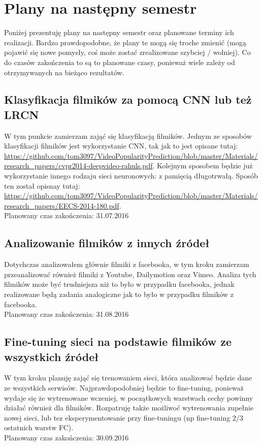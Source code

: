 \documentclass{article}
\begin{document}
\section{Plany na następny semestr}
Poniżej prezentuję plany na następny semestr oraz planowane terminy ich realizacji. Bardzo prawdopodobne, że plany te mogą się troche zmienić (mogą pojawić się nowe pomysły, coś może zostać zrealizowane szybciej / wolniej). Co do czasów zakończenia to są to planowane czasy, ponieważ wiele zależy od otrzymywanych na bieżąco rezultatów.

\subsection{Klasyfikacja filmików za pomocą CNN lub też LRCN}
W tym punkcie zamierzam zająć się klasyfikacją filmików. Jednym ze sposobów klasyfikacji filmików jest wykorzystanie CNN, tak jak to jest opisane tutaj: \url{https://github.com/tom3097/VideoPopularityPrediction/blob/master/Materials/research_papers/cvpr2014-deepvideo-rahuls.pdf}. Kolejnym sposobem będzie już wykorzystanie innego rodzaju sieci neuronowych: z pamięcią długotrwałą. Sposób ten został opisnay tutaj: \url{https://github.com/tom3097/VideoPopularityPrediction/blob/master/Materials/research_papers/EECS-2014-180.pdf}.
\\Planowany czas zakończenia: 31.07.2016

\subsection{Analizowanie filmików z innych źródeł}
Dotychczas analizowałem głównie filmiki z facebooka, w tym kroku zamierzam przeanalizować również filmiki z Youtube, Dailymotion oraz Vimeo. Analiza tych filmików może być trudniejsza niż to było w przypadku facebooka, jednak realizowane będą zadania analogiczne jak to było w przypadku filmików z facebooka.
\\Planowany czas zakończenia: 31.08.2016

\subsection{Fine-tuning sieci na podstawie filmików ze wszystkich źródeł}
W tym kroku planuję zająć się trenowaniem sieci, która analizować będzie dane ze wszystkich serwisów. Najprawdopodobniej będzie to fine-tuning, ponieważ wydaje się że wytrenowane wczeniej, w początkowych warstwach cechy powinny działać również dla filmików. Rozpatruję także możliwoć wytrenowania zupełnie nowej sieci, lub tez eksperymentowanie przy fine-tuningu (np fine-tuning 2/3 ostatnich warstw FC).
\\Planowany czas zakończenia: 30.09.2016
\end{document}
